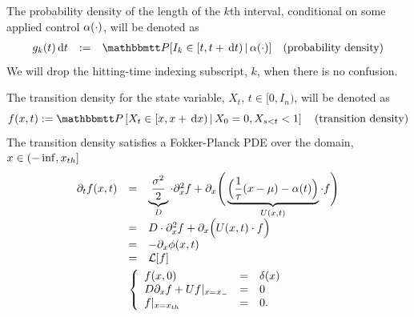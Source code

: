 The probability density of the length of the $k$th interval,
conditional on some applied control $\alpha(\cdot)$, will be denoted as
\begin{equation} 
\begin{array}{rcll} 
g_k(t) \intd{t} &:=& \Prob[I_{k} \in [t, t + \intd{t})  \,|\,
 \a(\cdot)] &
 \textrm{(probability density)} 
\end{array}
\label{eq:ISI_distribution_functions}
\end{equation}
We will drop the hitting-time indexing subscript, $k$, when there is no
confusion. 

The transition density for the state variable, $X_t$, $t \in [0, I_{n})$, will
be denoted as
\begin{equation}
f(x,t) := \Prob \left[X_{t} \in [x, x+ \intd{x})  \,|\,
 X_0 = 0, X_{s < t} < 1  \right]  \quad
 \textrm{(transition density)}
 \label{eq:transition_distribution}
\end{equation} 
The transition density satisfies a Fokker-Planck PDE over the domain, $x \in
(-\inf, { x_{th} }]$
\begin{equation}
\begin{gathered}
\begin{array}{lcl}
	{\partial}_t f (x,t) &=&
					\underbrace{\frac{\sigma^2 }{2}}_{D}\cdot {\partial}^2_x f 
					+ {\partial}_x \Bigg(  
					\underbrace{\Big( \frac 1{{ \tau }} (x-{\mu }) - \alpha(t) \Big)}_{U(x,t)}  \cdot  f
					\Bigg)
					\\
					&=&
					D \cdot {\partial}^2_x f +
					{\partial}_x  \Big( U(x,t) \cdot f \Big)
					\\
					&=&
					- {\partial}_x \phi(x,t)
					\\
					&=&
					{ \mathcal{L} }[f] 
					\end{array}
	\\
	\left\{ \begin{array}{lcl}
	 f (x,0) &=& \delta(x)
	\\
	D {\partial}_xf + U f |_{x={ x_{-} }} &=& 0 
	\\
	f |_{x={ x_{th} }} &=& 0.
	\end{array} \right.
\label{eq:FP_pde_OU_absorbBC}
\end{gathered}
\end{equation}

